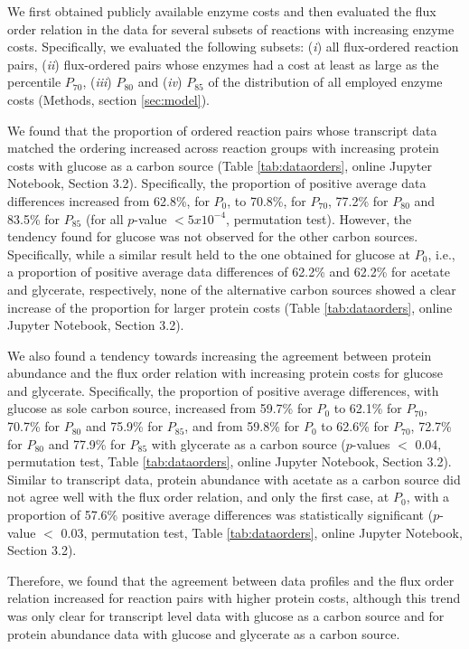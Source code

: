 \documentclass[12pt]{article}
\begin{document}
We first obtained publicly available enzyme costs \cite{Kaleta2013} and then evaluated the flux order relation in the data for several subsets of reactions with increasing enzyme costs. Specifically, we evaluated the following subsets: (\emph{i}) all flux-ordered reaction pairs, (\emph{ii}) flux-ordered pairs whose enzymes had a cost at least as large as the percentile $P_{70}$, (\emph{iii}) $P_{80}$ and (\emph{iv}) $P_{85}$ of the distribution of all employed enzyme costs (Methods, section \ref{sec:model}).

We found that the proportion of ordered reaction pairs whose transcript data matched the ordering increased across reaction groups with increasing protein costs with glucose as a carbon source (Table \ref{tab:dataorders}, online Jupyter Notebook, Section 3.2). Specifically, the proportion of positive average data differences increased from 62.8\%, for $P_{0}$, to 70.8\%, for $P_{70}$, 77.2\% for $P_{80}$ and 83.5\% for $P_{85}$ (for all $p$-value $< 5x10^{-4}$, permutation test). However, the tendency found for glucose was not observed for the other carbon sources. Specifically, while a similar result held to the one obtained for glucose at $P_{0}$, i.e., a proportion of positive average data differences of 62.2\% and 62.2\% for acetate and glycerate, respectively, none of the alternative carbon sources showed a clear increase of the proportion for larger protein costs (Table \ref{tab:dataorders}, online Jupyter Notebook, Section 3.2).

We also found a tendency towards increasing the agreement between protein abundance and the flux order relation with increasing protein costs for glucose and glycerate. Specifically, the proportion of positive average differences, with glucose as sole carbon source, increased from 59.7\% for $P_{0}$ to 62.1\% for $P_{70}$, 70.7\% for $P_{80}$ and 75.9\% for $P_{85}$, and from 59.8\% for $P_{0}$ to 62.6\% for $P_{70}$, 72.7\% for $P_{80}$ and 77.9\% for $P_{85}$ with glycerate as a carbon source ($p$-values $<$ 0.04, permutation test, Table \ref{tab:dataorders}, online Jupyter Notebook, Section 3.2). Similar to transcript data, protein abundance with acetate as a carbon source did not agree well with the flux order relation, and only the first case, at $P_{0}$, with a proportion of 57.6\% positive average differences was statistically significant ($p$-value $<$ 0.03, permutation test, Table \ref{tab:dataorders}, online Jupyter Notebook, Section 3.2).

Therefore, we found that the agreement between data profiles and the flux order relation increased for reaction pairs with higher protein costs, although this trend was only clear for transcript level data with glucose as a carbon source and for protein abundance data with glucose and glycerate as a carbon source.
\end{document}
